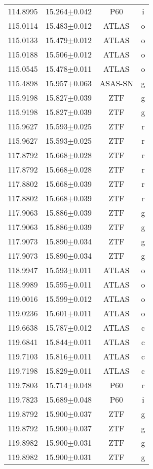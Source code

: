 \begin{table}
\begin{tabular}{cccc}
114.8995 & 15.264$\pm$0.042 & P60 & i \\
115.0114 & 15.483$\pm$0.012 & ATLAS & o \\
115.0133 & 15.479$\pm$0.012 & ATLAS & o \\
115.0188 & 15.506$\pm$0.012 & ATLAS & o \\
115.0545 & 15.478$\pm$0.011 & ATLAS & o \\
115.4898 & 15.957$\pm$0.063 & ASAS-SN & g \\
115.9198 & 15.827$\pm$0.039 & ZTF & g \\
115.9198 & 15.827$\pm$0.039 & ZTF & g \\
115.9627 & 15.593$\pm$0.025 & ZTF & r \\
115.9627 & 15.593$\pm$0.025 & ZTF & r \\
117.8792 & 15.668$\pm$0.028 & ZTF & r \\
117.8792 & 15.668$\pm$0.028 & ZTF & r \\
117.8802 & 15.668$\pm$0.039 & ZTF & r \\
117.8802 & 15.668$\pm$0.039 & ZTF & r \\
117.9063 & 15.886$\pm$0.039 & ZTF & g \\
117.9063 & 15.886$\pm$0.039 & ZTF & g \\
117.9073 & 15.890$\pm$0.034 & ZTF & g \\
117.9073 & 15.890$\pm$0.034 & ZTF & g \\
118.9947 & 15.593$\pm$0.011 & ATLAS & o \\
118.9989 & 15.595$\pm$0.011 & ATLAS & o \\
119.0016 & 15.599$\pm$0.012 & ATLAS & o \\
119.0236 & 15.601$\pm$0.011 & ATLAS & o \\
119.6638 & 15.787$\pm$0.012 & ATLAS & c \\
119.6841 & 15.844$\pm$0.011 & ATLAS & c \\
119.7103 & 15.816$\pm$0.011 & ATLAS & c \\
119.7198 & 15.829$\pm$0.011 & ATLAS & c \\
119.7803 & 15.714$\pm$0.048 & P60 & r \\
119.7823 & 15.689$\pm$0.048 & P60 & i \\
119.8792 & 15.900$\pm$0.037 & ZTF & g \\
119.8792 & 15.900$\pm$0.037 & ZTF & g \\
119.8982 & 15.900$\pm$0.031 & ZTF & g \\
119.8982 & 15.900$\pm$0.031 & ZTF & g \\

\end{tabular}
\end{table}
